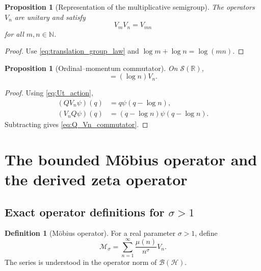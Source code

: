 \documentclass[11pt]{amsart}
\numberwithin{equation}{section}
\theoremstyle{plain}
\newtheorem{proposition}[theorem]{Proposition}
\theoremstyle{definition}
\newtheorem{definition}[theorem]{Definition}
\theoremstyle{remark}
\newcommand{\R}{\mathbb{R}}
\newcommand{\N}{\mathbb{N}}
\newcommand{\Hil}{\mathcal{H}}
\newcommand{\Sch}{\mathcal{S}}
\begin{document}
\begin{proposition}[Representation of the multiplicative semigroup]
\label{prop:multiplicative_representation}
The operators $V_n$ are unitary and satisfy
\begin{equation}
V_mV_n=V_{mn}
\label{eq:V_multiplicative_law}
\end{equation}
for all $m,n\in\N$.
\end{proposition}

\begin{proof}
Use \eqref{eq:translation_group_law} and
$\log m+\log n=\log(mn)$.
\end{proof}

\begin{proposition}[Ordinal--momentum commutator]
\label{prop:Q_Vn_commutator}
On $\Sch(\R)$,
\begin{equation}
[Q,V_n]=(\log n)V_n.
\label{eq:Q_Vn_commutator}
\end{equation}
\end{proposition}

\begin{proof}
Using \eqref{eq:Ut_action},
\begin{align}
(QV_n\psi)(q)
&=q\psi(q-\log n),
\label{eq:QVn_first}\\
(V_nQ\psi)(q)
&=(q-\log n)\psi(q-\log n).
\label{eq:VnQ_first}
\end{align}
Subtracting gives \eqref{eq:Q_Vn_commutator}.
\end{proof}

\section{The bounded M\"obius operator and the derived zeta operator}
\label{sec:mobius_zeta_bounded}

\subsection{Exact operator definitions for $\sigma>1$}
\label{subsec:bounded_definitions}

\begin{definition}[M\"obius operator]
\label{def:mobius_operator}
For a real parameter $\sigma>1$, define
\begin{equation}
\mathcal M_\sigma
=\sum_{n=1}^{\infty}\frac{\mu(n)}{n^\sigma}V_n.
\label{eq:mobius_operator_definition}
\end{equation}
The series is understood in the operator norm of
$\mathcal B(\Hil)$.
\end{definition}
\end{document}
